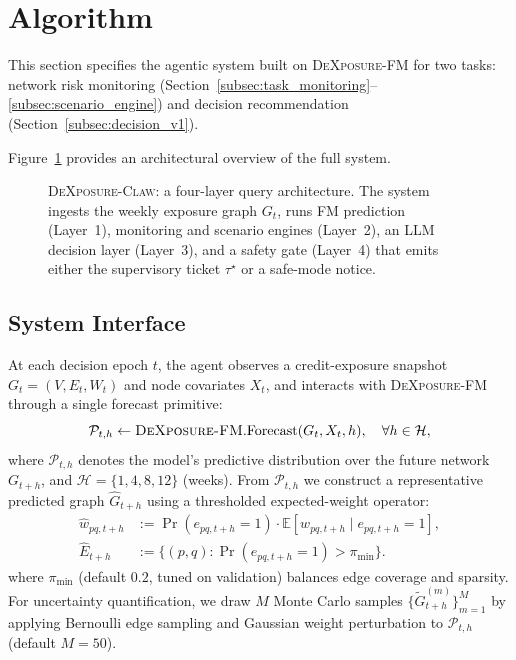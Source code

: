 \section{Algorithm}
\label{sec:algorithm}

This section specifies the agentic system built on \textsc{DeXposure-FM} for two tasks: network risk monitoring (Section~\ref{subsec:task_monitoring}--\ref{subsec:scenario_engine}) and decision recommendation (Section~\ref{subsec:decision_v1}).

Figure~\ref{fig:system_overview} provides an architectural overview of the full system.

\begin{figure}[!t]
    \centering
    \resizebox{0.95\textwidth}{!}{}
    \caption{\textsc{DeXposure-Claw}: a four-layer query architecture. The system ingests the weekly exposure graph $G_t$, runs FM prediction (Layer~1), monitoring and scenario engines (Layer~2), an LLM decision layer (Layer~3), and a safety gate (Layer~4) that emits either the supervisory ticket $\tau^\star$ or a safe-mode notice.}
    \label{fig:system_overview}
\end{figure}

\subsection{System Interface}
\label{subsec:system_interface}
At each decision epoch $t$, the agent observes a credit-exposure snapshot $G_t=(V,E_t,W_t)$ and node covariates $X_t$, and interacts with \textsc{DeXposure-FM} through a single forecast primitive:
\begin{equation}
\label{eq:agent_forecast_primitive}
\mathcal{P}_{t,h} \leftarrow \textsc{DeXposure-FM}.\mathrm{Forecast}(G_t,X_t,h), \quad \forall h\in\mathcal{H},
\end{equation}
where $\mathcal{P}_{t,h}$ denotes the model's predictive distribution over the future network $G_{t+h}$, and $\mathcal{H}=\{1,4,8,12\}$ (weeks). From $\mathcal{P}_{t,h}$ we construct a representative predicted graph $\widehat{G}_{t+h}$ using a thresholded expected-weight operator:
\begin{align}
\label{eq:expected_graph}
\widehat{w}_{pq,t+h}
&:=
\Pr(e_{pq,t+h}=1)\cdot \mathbb{E}[w_{pq,t+h}\mid e_{pq,t+h}=1],
\\
\widehat{E}_{t+h}
&:=\{(p,q): \Pr(e_{pq,t+h}=1)>\pi_{\min}\}.
\end{align}
where $\pi_{\min}$ (default $0.2$, tuned on validation) balances edge coverage and sparsity. For uncertainty quantification, we draw $M$ Monte Carlo samples $\{\widetilde{G}^{(m)}_{t+h}\}_{m=1}^M$ by applying Bernoulli edge sampling and Gaussian weight perturbation to $\mathcal{P}_{t,h}$ (default $M=50$).

